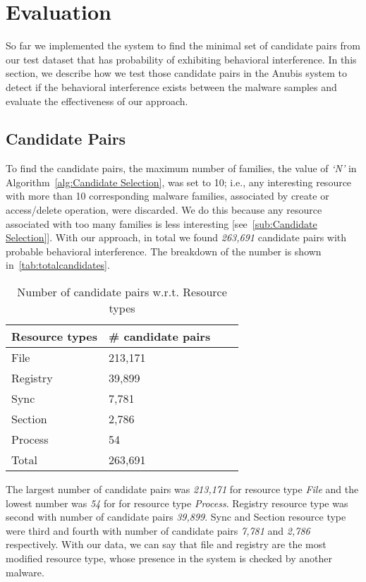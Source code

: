 \chapter{Evaluation}
\label{chapter:evaluation}
So far we implemented the system to find the minimal set of candidate pairs from our test dataset that has probability of exhibiting behavioral interference.
In this section, we describe how we test those candidate pairs in the Anubis system to detect if the behavioral interference exists between the malware samples and evaluate the effectiveness of our approach.
\section{Candidate Pairs}
\label{sec:Candidate Pairs}
To find the candidate pairs, the maximum number of families, the value of \emph{`N'} in Algorithm~\autoref{alg:Candidate Selection}, was set to 10;
i.e., any interesting resource with more than 10 corresponding malware families, associated by create or access/delete operation, were discarded.
We do this because any resource associated with too many families is less interesting [see~\autoref{sub:Candidate Selection}].
With our approach, in total we found \emph{263,691} candidate pairs with probable behavioral interference.
The breakdown of the number is shown in~\autoref{tab:totalcandidates}.

\begin{table}[ht]
  \caption[Number of probable candidate pairs w.r.t. Resource types]{Number of candidate pairs w.r.t. Resource types}\label{tab:totalcandidates}
  \centering
  \begin{tabular}{l l l l}
    \toprule
    Resource types & \# candidate pairs\\
    \midrule
    File & 213,171 \\
    Registry & 39,899 \\
    Sync & 7,781 \\
    Section & 2,786 \\
    Process & 54\\
    \bottomrule
    Total & 263,691\\
  \end{tabular}
\end{table}
The largest number of candidate pairs was \emph{213,171} for resource type \emph{File} and the lowest number was \emph{54} for for resource type \emph{Process}.
Registry resource type was second with number of candidate pairs \emph{39,899}.
Sync and Section resource type were third and fourth with number of candidate pairs \emph{7,781} and \emph{2,786} respectively.
With our data, we can say that file and registry are the most modified resource type, whose presence in the system is checked by another malware.\\

